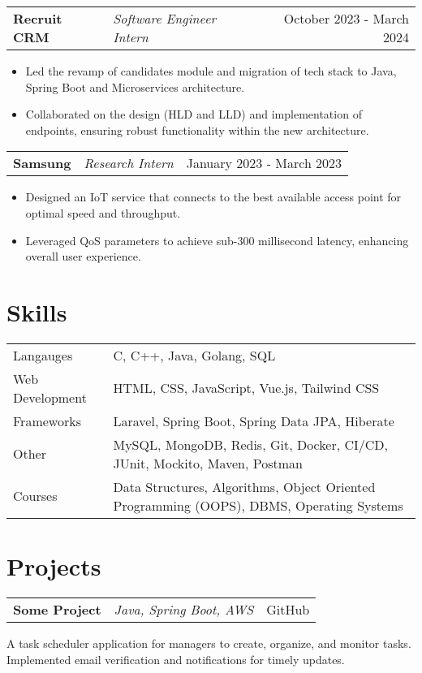 \documentclass[a4paper,10pt]{article}
\makeatletter
\newenvironment{jobshort}[3]
    {
    \begin{tabularx}{\linewidth}{@{}l X r@{}}
    \textbf{#1} & \textit{#2} &  #3 \\[3pt]
    \end{tabularx}
    }
    {
    }
\newenvironment{joblong}[3]
    {
    \begin{tabularx}{\linewidth}{@{}l X r@{}}
    \textbf{#1} & \textit{#2} &  #3 \\[3pt]
    \end{tabularx}
    \begin{minipage}[t]{\linewidth}
    \begin{itemize}[nosep,after=\strut, leftmargin=1em, itemsep=2pt,label=--]
    }
    {
    \end{itemize}
    \end{minipage}    
    }
\makeatother
\begin{document}
\begin{joblong}{Recruit CRM}{Software Engineer Intern}{October 2023 - March 2024}
    \item Led the revamp of candidates module and migration of tech stack to Java, Spring Boot and Microservices architecture.
    \item Collaborated on the design (HLD and LLD) and implementation of endpoints, ensuring robust functionality within the
    new architecture.
    \end{joblong}

\begin{joblong}{Samsung}{Research Intern}{January 2023 - March 2023}
    \item Designed an IoT service that connects to the best available access point for optimal speed and throughput.
    \item Leveraged QoS parameters to achieve sub-300 millisecond latency, enhancing overall user experience.
\end{joblong}
\vspace{-5pt}

\section{Skills}
\vspace{-5pt}
\begin{tabularx}{\linewidth}{@{}l X@{}}
Langauges &  \normalsize{C, C++, Java, Golang, SQL}\\
Web Development & \normalsize{HTML, CSS, JavaScript, Vue.js, Tailwind CSS}\\
Frameworks &  \normalsize{Laravel, Spring Boot, Spring Data JPA, Hiberate}\\
Other & \normalsize{MySQL, MongoDB, Redis, Git, Docker, CI/CD, JUnit, Mockito, Maven, Postman}\\
Courses & Data Structures, Algorithms, Object Oriented Programming (OOPS), DBMS, Operating Systems
\end{tabularx}
\vspace{-5pt}


  
\section{Projects}
\vspace{-5pt}
\begin{jobshort}{Some Project}{Java, Spring Boot, AWS}{GitHub}
    A task scheduler application for managers to create, organize, and monitor tasks. Implemented email verification and
notifications for timely updates.
\end{jobshort}
\end{document}
